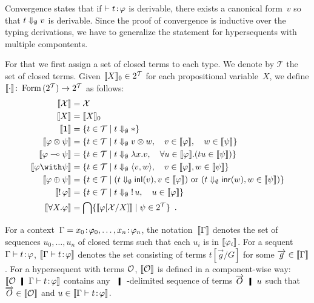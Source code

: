 Convergence states that if
$\vdash{t} \mathord{\colon\kern -2pt}{\varphi}$ is derivable,
there exists a canonical form~$v$ so that $t\Downarrow_\emptyset v$ is derivable.
Since the proof of convergence is inductive over
the typing derivations, we have to generalize the statement for
hypersequents with multiple compontents.

For that we first assign a set of closed terms to each type.
\newcommand{\terms}{\mathcal{T}}
We denote by $\terms$ the set of closed terms.
Given $\semo{X}_0\in 2^\terms$ for each propositional variable~$X$,
we define $\semo{\cdot}\colon \form{(2^\terms)}\rightarrow {2^\terms}$
as follows:
\begin{align*}
 \semo{\mathcal X} &= \mathcal X\\
 \semo{X} &= \semo{X}_0\\
 \semo{\one} &= \{t\in \terms \mid t\eval_\emptyset \ast\} \\
 \semo{\phi\otimes \psi}&= \{t\in\terms \mid t\eval_\emptyset v\otimes w,\quad
 v\in\semo{\phi},\quad w\in \semo{\psi}\}\\
 \semo{\phi\limp\psi}&= \{t\in\terms \mid t\eval_\emptyset \lambda x.v,\quad
 \forall u\in\semo{\phi}.(tu\in\semo{\psi})\}\\
 \semo{\phi\with\psi}&= \{t\in\terms \mid t\eval_\emptyset\lpair{v,w},\quad
 v\in\semo{\phi}, w\in\semo{\psi}\}\\
 \semo{\phi\oplus\psi}&= \{t\in\terms\mid (t\eval_\emptyset \inl{v}, v\in
 \semo{\phi})\text{ or }(t\eval_\emptyset\inr{w}, w \in \semo{\psi})\}\\
 \semo{\bang \phi}&= \{t\in\terms \mid t\eval_\emptyset \bang u, \quad
 u\in\semo{\phi}\}\\
 \semo{\forall X.\phi}&= \bigcap\{\semo{\phi[\mathcal X/X]}\mid \psi\in
 2^\terms\}\enspace.
\end{align*}

For a context~$\Gamma = {x_0} \mathord{\colon\kern -2pt}{\varphi_0},\ldots,{x_n} \mathord{\colon\kern -2pt}{\varphi_n}$,
the notation~$\llbracket{\Gamma}\rrbracket$ denotes the set of sequences $u_0,\ldots,u_n$
of closed terms
such that each $u_i$ is in $\llbracket{\varphi_i}\rrbracket$.
For a sequent $\Gamma\vdash{t} \mathord{\colon\kern -2pt}{\varphi}$, $\llbracket{\Gamma\vdash {t} \mathord{\colon\kern -2pt}{\varphi} }\rrbracket$ denotes
the set consisting of terms $t[\vec g/G]$ for some $\overrightarrow g\in\llbracket{\Gamma}\rrbracket$.
For a hypersequent with terms $\mathcal{O}$,
$\llbracket{\mathcal{O}}\rrbracket$ is defined in a component-wise way:
$\semo{\hypert\hmid\G\tr\tj t\phi}$ contains any {\kern
-6pt}$\hmid${\kern -6pt}-delimited
sequence of terms
$\vec O \hmid u$ such that $\overrightarrow O\in\llbracket{\mathcal{O}}\rrbracket$ and
$u\in\llbracket{\Gamma\vdash {t} \mathord{\colon\kern -2pt}{\varphi} }\rrbracket$.

